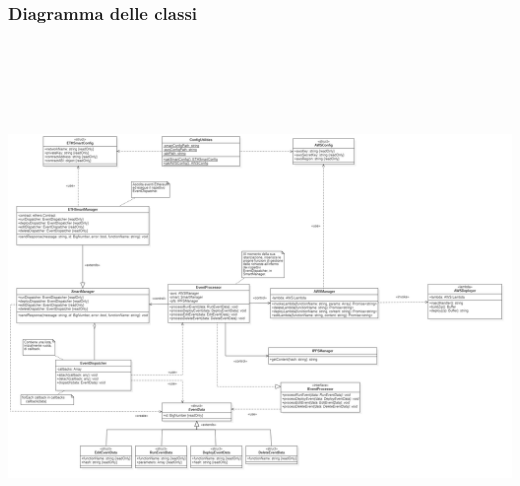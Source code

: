 \restoregeometry
{}
\begin{landscape}
\subsubsection{Diagramma delle classi}
	\includegraphics[width=21.5cm, height=14cm]{././diagrammi/etherless-server/Etherless-server-classi.png}
\end{landscape}
\restoregeometry
